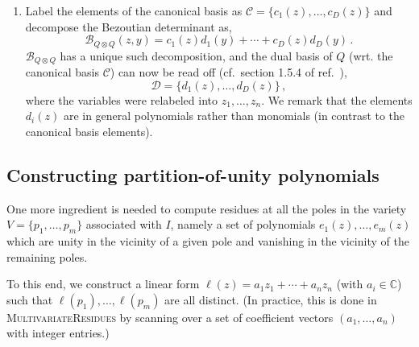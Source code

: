 \documentclass[dvipsnames,preprint,12pt,sort&compress]{elsarticle}
\begin{document}
\begin{enumerate}
\item Label the elements of the canonical basis as
$\mathcal{C} = \{ c_1 (z), \ldots, c_D (z)\}$ and decompose the
Bezoutian determinant as,
\begin{equation}
\mathcal{B}_{Q \otimes Q} (z, y) = c_1 (z) d_1 (y)
+ \cdots + c_D (z) d_D (y) \,.
\end{equation}
$\mathcal{B}_{Q \otimes Q}$ has a unique such decomposition, and the dual basis
of $Q$ (wrt. the canonical basis $\mathcal{C}$) can now be read off
(cf.~section 1.5.4 of ref.~\cite{CattaniDickenstein}),
\begin{equation}
\mathcal{D} = \{ d_1 (z), \ldots, d_D (z) \} \,,
\end{equation}
where the variables were relabeled into $z_1, \ldots, z_n$. We remark that the
elements $d_i (z)$ are in general polynomials
rather than monomials (in contrast to the canonical basis elements).
\end{enumerate}


\subsection{Constructing partition-of-unity polynomials}

One more ingredient is needed to compute residues at all the poles in
the variety $V = \{ p_1, \ldots, p_m \}$ associated with $I$, namely a set of
polynomials $e_1(z), \ldots, e_m(z)$
which are unity in the vicinity of a given pole and vanishing in the vicinity
of the remaining poles.

To this end, we construct a linear form $\ell (z) = a_1 z_1 + \cdots + a_n z_n$
(with $a_i \in \mathbb{C}$) such that $\ell(p_1), \ldots, \ell(p_m)$ are all distinct.
(In practice, this is done in \textsc{MultivariateResidues}\- by scanning over a set
of coefficient vectors $(a_1, \ldots, a_n)$ with integer entries.)
\end{document}
